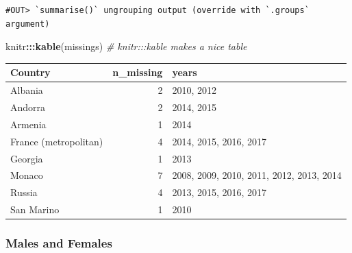 \documentclass[]{book}
\newenvironment{Shaded}{\begin{snugshade}}{\end{snugshade}}
\newcommand{\CommentTok}[1]{\textcolor[rgb]{0.56,0.35,0.01}{\textit{#1}}}
\newcommand{\DataTypeTok}[1]{\textcolor[rgb]{0.13,0.29,0.53}{#1}}
\newcommand{\KeywordTok}[1]{\textcolor[rgb]{0.13,0.29,0.53}{\textbf{#1}}}
\newcommand{\NormalTok}[1]{#1}
\newcommand{\OperatorTok}[1]{\textcolor[rgb]{0.81,0.36,0.00}{\textbf{#1}}}
\newcommand{\StringTok}[1]{\textcolor[rgb]{0.31,0.60,0.02}{#1}}
\begin{document}
\begin{Shaded}
\end{Shaded}

\begin{verbatim}
#OUT> `summarise()` ungrouping output (override with `.groups` argument)
\end{verbatim}

\begin{Shaded}
\begin{Highlighting}[]
\NormalTok{knitr}\OperatorTok{:::}\KeywordTok{kable}\NormalTok{(missings)  }\CommentTok{# knitr:::kable makes a nice table}
\end{Highlighting}
\end{Shaded}

\begin{tabular}{l|r|l}
\hline
Country & n\_missing & years\\
\hline
Albania & 2 & 2010, 2012\\
\hline
Andorra & 2 & 2014, 2015\\
\hline
Armenia & 1 & 2014\\
\hline
France (metropolitan) & 4 & 2014, 2015, 2016, 2017\\
\hline
Georgia & 1 & 2013\\
\hline
Monaco & 7 & 2008, 2009, 2010, 2011, 2012, 2013, 2014\\
\hline
Russia & 4 & 2013, 2015, 2016, 2017\\
\hline
San Marino & 1 & 2010\\
\hline
\end{tabular}

\hypertarget{males-and-females}{%
\subsubsection*{Males and Females}\label{males-and-females}}
\end{document}
